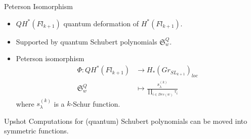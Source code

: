 \documentclass{beamer}
\DeclareMathOperator{\Gr}{Gr}
\newcommand{\sym}{\Lambda}
\renewcommand{\S}{\mathfrak{S}}
\begin{document}
\begin{frame}{Peterson Isomorphism}
  \begin{itemize}
  \item \(QH^*(Fl_{k+1})\) quantum deformation of
    \(H^*(Fl_{k+1})\).\pause
  \item Supported by quantum Schubert polynomials \(\S_w^Q\).\pause
  \item Peterson isomorphism
    \begin{align*}
      \Phi\colon QH^*(Fl_{k+1}) & \to H_*(Gr_{SL_{k+1}})_{loc}\\
      \S_w^Q & \mapsto \frac{s_\lambda^{(k)} }{\prod_{i \in Des(w)} \tau_i} 
    \end{align*}
    where \(s_\lambda^{(k)}\) is a \(k\)-Schur function.
    \pause
  \end{itemize}
  \begin{block}{Upshot}
    Computations for (quantum) Schubert polynomials can be moved into symmetric functions.
  \end{block}
\end{frame}
\end{document}
